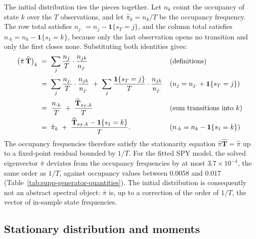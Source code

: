 The initial distribution ties the pieces together. Let
$n_k$ count the occupancy of state $k$ over the $T$ observations, and
let $\hat\pi_k = n_k / T$ be the occupancy frequency. The row total
satisfies $n_{j\cdot} = n_j - \mathbf{1}\{s_T = j\}$, and the column
total satisfies
$n_{\cdot k} = n_k - \mathbf{1}\{s_1 = k\}$, because only the last
observation opens no transition and only the first closes none.
Substituting both identities gives:
\begin{align}
  \big(\hat\pi\, \widehat{\mathbf{T}}\big)_k
   &\;=\; \sum_j \frac{n_j}{T} \cdot \frac{n_{jk}}{n_{j \cdot}}
     && \text{(definitions)} \notag \\
   &\;=\; \sum_j \frac{n_{j \cdot}}{T} \cdot \frac{n_{jk}}{n_{j \cdot}}
     \;+\; \sum_j \frac{\mathbf{1}\{s_T = j\}}{T}
       \cdot \frac{n_{jk}}{n_{j \cdot}}
     && \text{($n_j = n_{j\cdot} + \mathbf{1}\{s_T = j\}$)} \notag \\
   &\;=\; \frac{n_{\cdot k}}{T}
     \;+\; \frac{\widehat{\mathbf{T}}_{s_T, k}}{T}
     && \text{(sum transitions into $k$)} \notag \\
   &\;=\; \hat\pi_k
     \;+\; \frac{\widehat{\mathbf{T}}_{s_T, k}
       - \mathbf{1}\{s_1 = k\}}{T}.
     && \text{($n_{\cdot k} = n_k - \mathbf{1}\{s_1 = k\}$)}
  \label{eq:supp-fixed-point}
\end{align}
The occupancy frequencies therefore satisfy the stationarity equation
$\hat\pi \widehat{\mathbf{T}} = \hat\pi$ up to a fixed-point residual
bounded by $1/T$. For the fitted SPY model, the solved eigenvector
$\bar\pi$ deviates from the occupancy frequencies by at most $3.7
\times 10^{-4}$, the same order as $1/T$, against occupancy values
between $0.0058$ and $0.017$ (Table~\ref{tab:supp-generator-quantities}). The
initial distribution is consequently not an abstract spectral object:
$\bar\pi$ is, up to a correction of the order of $1/T$, the vector of
in-sample state frequencies.

\subsection{Stationary distribution and moments}
\label{sec:supp-gen-moments}

